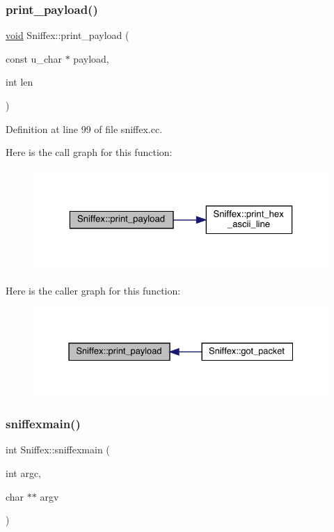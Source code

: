 \subsubsection{\texorpdfstring{print\+\_\+payload()}{print\_payload()}}
{\footnotesize\ttfamily \mbox{\hyperlink{glad_8h_a950fc91edb4504f62f1c577bf4727c29}{void}} Sniffex\+::print\+\_\+payload (\begin{DoxyParamCaption}\item[{const u\+\_\+char $\ast$}]{payload,  }\item[{int}]{len }\end{DoxyParamCaption})}



Definition at line 99 of file sniffex.\+cc.

Here is the call graph for this function\+:\nopagebreak
\begin{figure}[H]
\begin{center}
\leavevmode
\includegraphics[width=323pt]{class_sniffex_a1b24163d441d38f3672800c3de85d149_cgraph}
\end{center}
\end{figure}
Here is the caller graph for this function\+:\nopagebreak
\begin{figure}[H]
\begin{center}
\leavevmode
\includegraphics[width=331pt]{class_sniffex_a1b24163d441d38f3672800c3de85d149_icgraph}
\end{center}
\end{figure}
\mbox{\label{class_sniffex_a41e146d588c285c94c0beee223d8552b}} 
\subsubsection{\texorpdfstring{sniffexmain()}{sniffexmain()}}
{\footnotesize\ttfamily int Sniffex\+::sniffexmain (\begin{DoxyParamCaption}\item[{int}]{argc,  }\item[{char $\ast$$\ast$}]{argv }\end{DoxyParamCaption})}



